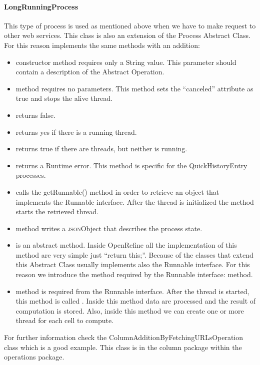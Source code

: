 \paragraph{LongRunningProcess} This type of process is used as mentioned above when we have to make request to other web services. This class is also an extension of the Process Abstract Class. For this reason implements the same methods with an addition:
\begin{itemize}
	\item constructor method requires only a String value. This parameter should contain a description of the Abstract Operation.
	\item {} method requires no parameters. This method sets the ``canceled'' attribute as true and stops the alive thread.
	\item {} returns false.
	\item {} returns yes if there is a running thread.
	\item {} returns true if there are threads, but neither is running.
	\item {} returns a Runtime error. This method is specific for the QuickHistoryEntry processes.
	\item {} calls the getRunnable() method in order to retrieve an object that implements the Runnable interface. After the thread is initialized the method starts the retrieved thread.
	\item {} method writes a \textsc{json}Object that describes the process state.
	\item {} is an abstract method. Inside OpenRefine all the implementation of this method are very simple just ``return this;''. Because of the classes that extend this Abstract Class usually implements also the Runnable interface. For this reason we introduce the method required by the Runnable interface:  method.
	\item {} method is required from the Runnable interface. After the thread is started, this method is called . Inside this method data are processed and the result of computation is stored. Also, inside this method we can create one or more thread for each cell to compute. 
\end{itemize}
For further information check the ColumnAdditionByFetchingURLsOperation class which is a good example. This class is in the column package within the operations package. 

